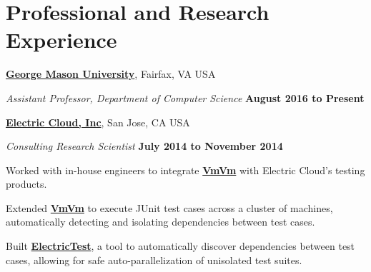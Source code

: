 \documentclass[10pt]{article}
\begin{document}
\section{Professional and Research Experience}

\href{http://cs.gmu.edu/}{\textbf{George Mason University}},
Fairfax, VA USA
\begin{outerlist}
\item[] \textit{Assistant Professor, Department of Computer Science}%
    \hfill \textbf{August 2016 to Present}

\end{outerlist}

\halfblankline


\href{http://www.electric-cloud.com/}{\textbf{Electric Cloud, Inc}},
San Jose, CA USA
\begin{outerlist}
\item[] \textit{Consulting Research Scientist}%
    \hfill \textbf{July 2014 to November 2014}%
    \begin{innerlist}
    \item Worked with in-house engineers to integrate \href{http://jonbell.net/publications/vmvm}{\textbf{VmVm}} with Electric Cloud's testing products.
           \item Extended  \href{http://jonbell.net/publications/vmvm}{\textbf{VmVm}} to execute JUnit test cases across a cluster of machines, automatically detecting and isolating dependencies between test cases.
            \item Built  \href{http://jonbell.net/publications/electrictest}{\textbf{ElectricTest}}, a tool to automatically discover dependencies between test cases, allowing for safe auto-parallelization of unisolated test suites.
        \end{innerlist}

\end{outerlist}

\halfblankline
\end{document}
